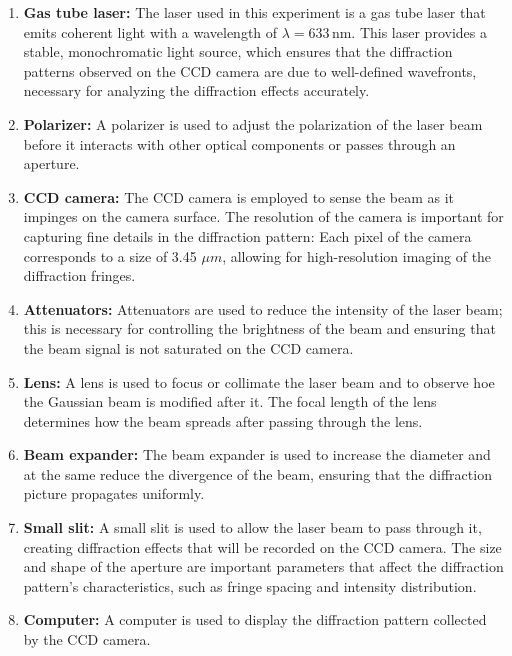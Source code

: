 \documentclass[prl,twocolumn]{revtex4-1}
\begin{document}
\begin{enumerate}
    \item \textbf{Gas tube laser:} The laser used in this experiment is a gas tube laser that emits coherent light with a wavelength of $\lambda = 633 \, \text{nm}$. This laser provides a stable, monochromatic light source, which ensures that the diffraction patterns observed on the CCD camera are due to well-defined wavefronts, necessary for analyzing the diffraction effects accurately.
    
    \item \textbf{Polarizer:} A polarizer is used to adjust the polarization of the laser beam before it interacts with other optical components or passes through an aperture.
    
    \item \textbf{CCD camera:} The CCD camera is employed to sense the beam as it impinges on the camera surface. The resolution of the camera is important for capturing fine details in the diffraction pattern: Each pixel of the camera corresponds to a size of 3.45 $\mu m$, allowing for high-resolution imaging of the diffraction fringes.
    
    \item \textbf{Attenuators:} Attenuators are used to reduce the intensity of the laser beam; this is necessary for controlling the brightness of the beam and ensuring that the beam signal is not saturated on the CCD camera.
    
    \item \textbf{Lens:} A lens is used to focus or collimate the laser beam and to observe hoe the Gaussian beam is modified after it. The focal length of the lens determines how the beam spreads after passing through the lens.
    
    \item \textbf{Beam expander:} The beam expander is used to increase the diameter and at the same reduce the divergence of the beam,  ensuring that the diffraction picture propagates uniformly. 
    
    \item \textbf{Small slit:} A small slit is used to allow the laser beam to pass through it, creating diffraction effects that will be recorded on the CCD camera. The size and shape of the aperture are important parameters that affect the diffraction pattern's characteristics, such as fringe spacing and intensity distribution.
    
    \item \textbf{Computer:} A computer is used to display the diffraction pattern collected by the CCD camera.
\end{enumerate}
\end{document}

